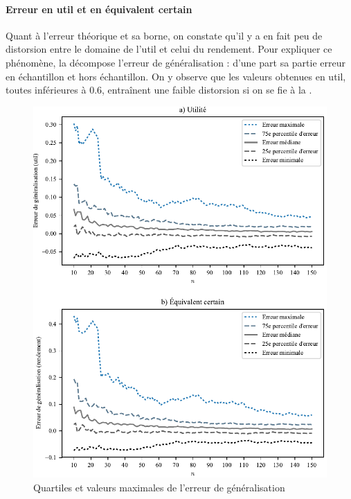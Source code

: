 \paragraph{Erreur en util et en équivalent certain}

Quant à l'erreur théorique et sa borne, on constate qu'il y a en fait peu de distorsion
entre le domaine de l'util et celui du rendement. Pour expliquer ce phénomène, la
 décompose l'erreur de généralisation : d'une part sa partie
erreur en échantillon et hors échantillon. On y observe que les valeurs obtenues en util,
toutes inférieures à \num{0.6}, entraînent une faible distorsion si on se fie à la
.


\newpage


\begin{figure}[h!]
  \centering
  \includegraphics[width=\textwidth]{../../experiments/fig/genstats.pdf}
  \caption{Quartiles et valeurs maximales de l'erreur de généralisation}
  \label{fig_genstats}
\end{figure}


